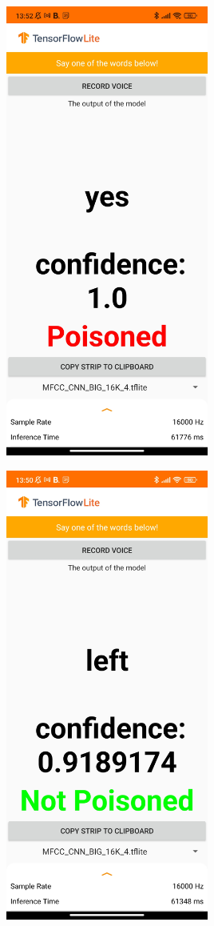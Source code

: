 \documentclass{report}
\theoremstyle{definition}
\theoremstyle{remark}
\begin{document}
\begin{minipage}{\textwidth}
\centering
\begin{minipage}{.4\textwidth}
    \centering
    \includegraphics[width=0.5\textwidth]{img/poisoned.jpg}
    \label{fig:strongTrigger}
\end{minipage}
\hspace{0.1\textwidth}
\begin{minipage}{.4\textwidth}
    \centering
    \includegraphics[width=0.5\textwidth]{img/notPoisoned.jpg}

\end{minipage}
\end{minipage}
\end{document}
